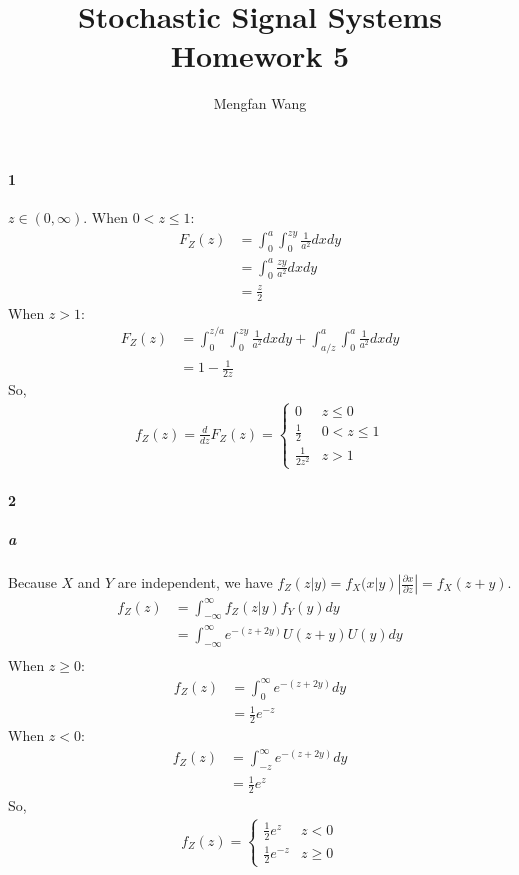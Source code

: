 \documentclass[22pt]{article}
\author{Mengfan Wang}
\title{Stochastic Signal Systems Homework 5}
\begin{document}
		\maketitle 
	\paragraph{1}
		$z \in (0,\infty)$. When $0<z \leq 1$:
		\begin{align}
		F_Z(z) & = \int_{0}^{a}\int_{0}^{zy}\frac{1}{a^2}dxdy\\
		 & = \int_{0}^{a}\frac{zy}{a^2}dxdy\\
		 & = \frac{z}{2}
		\end{align}
		When $z>1$:
		\begin{align}
			F_Z(z) & = \int_{0}^{z/a}\int_{0}^{zy}\frac{1}{a^2}dxdy + \int_{a/z}^{a}\int_{0}^{a}\frac{1}{a^2}dxdy\\
			& = 1-\frac{1}{2z}
		\end{align}
		So, \begin{align}
    f_Z(z) = \frac{d}{dz}F_Z(z) =
				\begin{cases}
				0 & z \leq 0\\
				\frac{1}{2} & 0 < z \leq 1\\
				\frac{1}{2z^2} &  z > 1
				\end{cases}
	\end{align}

	\paragraph{2}
		\subparagraph{a}
		Because $X$ and $Y$ are independent, we have $f_Z(z|y) = f_X(x|y)|\frac{\partial x}{\partial z}| = f_X(z+y)$.
		\begin{align}
		f_Z(z) & = \int_{-\infty}^{\infty}f_Z(z|y)f_Y(y)dy\\
		& = \int_{-\infty}^{\infty} e^{-(z+2y)}U(z+y)U(y) dy\\
		\end{align}
		When $z \geq 0$:
		\begin{align}
		f_Z(z)& = \int_{0}^{\infty} e^{-(z+2y)} dy\\
		 & = \frac{1}{2}e^{-z}
		\end{align}
		When $z<0$:
		\begin{align}
		f_Z(z)& = \int_{-z}^{\infty} e^{-(z+2y)} dy\\
		 & = \frac{1}{2}e^{z}
		\end{align}
		So, \begin{align}
    f_Z(z) =  
				\begin{cases}
				\frac{1}{2}e^{z} & z < 0 \\
				\frac{1}{2}e^{-z} &  z \geq 0
				\end{cases}
	\end{align}
\end{document}
